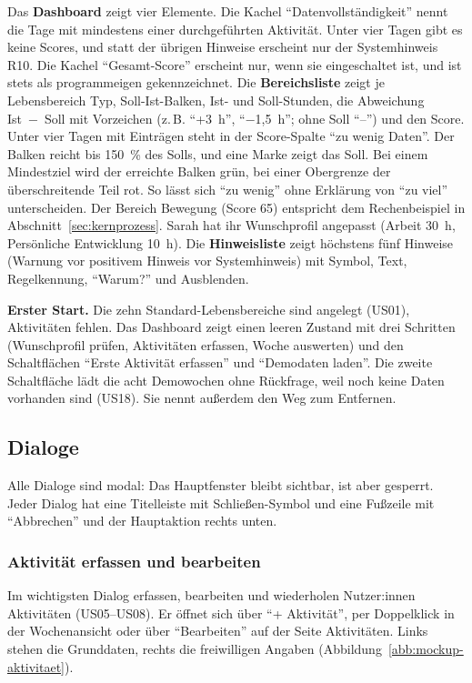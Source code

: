 Das \textbf{Dashboard} zeigt vier Elemente. Die Kachel \enquote{Datenvollständigkeit} nennt die Tage mit mindestens einer durchgeführten Aktivität. Unter vier Tagen gibt es keine Scores, und statt der übrigen Hinweise erscheint nur der Systemhinweis R10. Die Kachel \enquote{Gesamt-Score} erscheint nur, wenn sie eingeschaltet ist, und ist stets als programmeigen gekennzeichnet. Die \textbf{Bereichsliste} zeigt je Lebensbereich Typ, Soll-Ist-Balken, Ist- und Soll-Stunden, die Abweichung Ist~−~Soll mit Vorzeichen (z.\,B. \enquote{+3~h}, \enquote{−1,5~h}; ohne Soll \enquote{–}) und den Score. Unter vier Tagen mit Einträgen steht in der Score-Spalte \enquote{zu wenig Daten}. Der Balken reicht bis 150~\% des Solls, und eine Marke zeigt das Soll. Bei einem Mindestziel wird der erreichte Balken grün, bei einer Obergrenze der überschreitende Teil rot. So lässt sich \enquote{zu wenig} ohne Erklärung von \enquote{zu viel} unterscheiden. Der Bereich Bewegung (Score 65) entspricht dem Rechenbeispiel in Abschnitt~\ref{sec:kernprozess}. Sarah hat ihr Wunschprofil angepasst (Arbeit 30~h, Persönliche Entwicklung 10~h). Die \textbf{Hinweisliste} zeigt höchstens fünf Hinweise (Warnung vor positivem Hinweis vor Systemhinweis) mit Symbol, Text, Regelkennung, \enquote{Warum?} und Ausblenden.

\textbf{Erster Start.} Die zehn Standard-Lebensbereiche sind angelegt (US01), Aktivitäten fehlen. Das Dashboard zeigt einen leeren Zustand mit drei Schritten (Wunschprofil prüfen, Aktivitäten erfassen, Woche auswerten) und den Schaltflächen \enquote{Erste Aktivität erfassen} und \enquote{Demodaten laden}. Die zweite Schaltfläche lädt die acht Demowochen ohne Rückfrage, weil noch keine Daten vorhanden sind (US18). Sie nennt außerdem den Weg zum Entfernen.

\subsection{Dialoge}\label{sec:dialoge}
Alle Dialoge sind modal: Das Hauptfenster bleibt sichtbar, ist aber gesperrt. Jeder Dialog hat eine Titelleiste mit Schließen-Symbol und eine Fußzeile mit \enquote{Abbrechen} und der Hauptaktion rechts unten.

\subsubsection{Aktivität erfassen und bearbeiten}\label{sec:dlg-aktivitaet}
Im wichtigsten Dialog erfassen, bearbeiten und wiederholen Nutzer:innen Aktivitäten (US05--US08). Er öffnet sich über \enquote{+ Aktivität}, per Doppelklick in der Wochenansicht oder über \enquote{Bearbeiten} auf der Seite Aktivitäten. Links stehen die Grunddaten, rechts die freiwilligen Angaben (Abbildung~\ref{abb:mockup-aktivitaet}).

